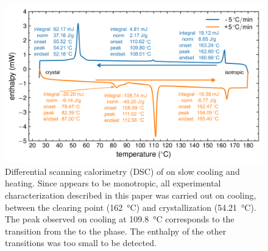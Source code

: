 \documentclass[superscriptaddress,floatfix,onecolumn,notitlepage]{revtex4-1}
\begin{document}
\begin{figure}[H]
    \centering
    \includegraphics[width=.7\textwidth]{dsc-slowrunFinal.png}
    \caption{Differential scanning calorimetry (DSC) of \nfour{} on slow cooling
    and heating.
    Since \nfour{} appears to be monotropic, all
    experimental characterization described in this paper was carried out on cooling, between the clearing point
    (\SI{162}{\degreeCelsius}) and crystallization
    (\SI{54.21}{\degreeCelsius}).
    The peak observed on cooling at \SI{109.8}{\degreeCelsius}
    corresponds to the transition from the  to the
     phase.
    The enthalpy of the other transitions was too small to be detected.}
\end{figure}
\end{document}

